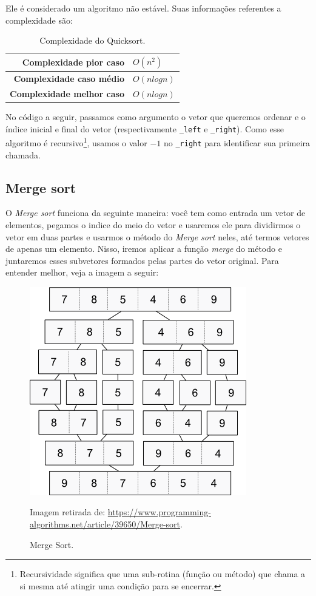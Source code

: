 Ele é considerado um algoritmo não estável. Suas informações referentes a complexidade são:

\begin{table}[H]
 \centering
	\begin{tabular}{| r | l |}
		\hline
		\textbf{Complexidade pior caso}   & $O(n^{2})$ \\
		\hline
		\textbf{Complexidade caso médio}  & $O(nlogn)$ \\
		\hline
		\textbf{Complexidade melhor caso} & $O(nlogn)$ \\
		\hline
	\end{tabular}
	\caption{Complexidade do Quicksort.}
	\label{t_quicksort}
\end{table}

No código a seguir, passamos como argumento o vetor que queremos ordenar e o índice inicial e final do vetor (respectivamente \texttt{\_left} e \texttt{\_right}). Como esse algoritmo é recursivo\footnote{Recursividade significa que uma sub-rotina (função ou método) que chama a si mesma até atingir uma condição para se encerrar.}, usamos o valor $-1$ no \texttt{\_right} para identificar sua primeira chamada.



\subsection{Merge sort}
O \textit{Merge sort} funciona da seguinte maneira: você tem como entrada um vetor de elementos, pegamos o indice do meio do vetor e usaremos ele para dividirmos o vetor em duas partes e usarmos o método do \textit{Merge sort} neles, até termos vetores de apenas um elemento. Nisso, iremos aplicar a função \textit{merge} do método e juntaremos esses subvetores formados pelas partes do vetor original. Para entender melhor, veja a imagem a seguir:

\begin{figure}[H]
	\centering
	\includegraphics[scale=0.4]{img/merge_sort.png}
	\caption{Merge Sort.}
	\small{Imagem retirada de: \url{https://www.programming-algorithms.net/article/39650/Merge-sort}.}
	\label{merge_sort}
\end{figure}

